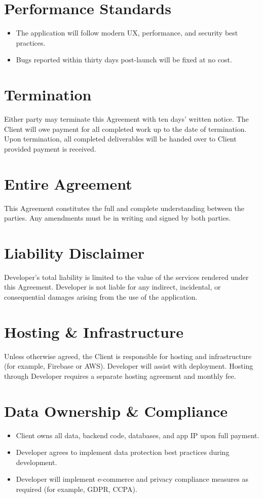 \documentclass[11pt,letterpaper]{article}
\begin{document}
\section{Performance Standards}
\begin{itemize}[leftmargin=*]
\item The application will follow modern UX, performance, and security best practices.
\item Bugs reported within thirty days post-launch will be fixed at no cost.
\end{itemize}

\section{Termination}
Either party may terminate this Agreement with ten days' written notice. The Client will owe payment for all completed work up to the date of termination. Upon termination, all completed deliverables will be handed over to Client provided payment is received.

\section{Entire Agreement}
This Agreement constitutes the full and complete understanding between the parties. Any amendments must be in writing and signed by both parties.

\section{Liability Disclaimer}
Developer's total liability is limited to the value of the services rendered under this Agreement. Developer is not liable for any indirect, incidental, or consequential damages arising from the use of the application.

\section{Hosting \& Infrastructure}
Unless otherwise agreed, the Client is responsible for hosting and infrastructure (for example, Firebase or AWS). Developer will assist with deployment. Hosting through Developer requires a separate hosting agreement and monthly fee.

\section{Data Ownership \& Compliance}
\begin{itemize}[leftmargin=*]
\item Client owns all data, backend code, databases, and app IP upon full payment.
\item Developer agrees to implement data protection best practices during development.
\item Developer will implement e-commerce and privacy compliance measures as required (for example, GDPR, CCPA).
\end{itemize}
\end{document}

